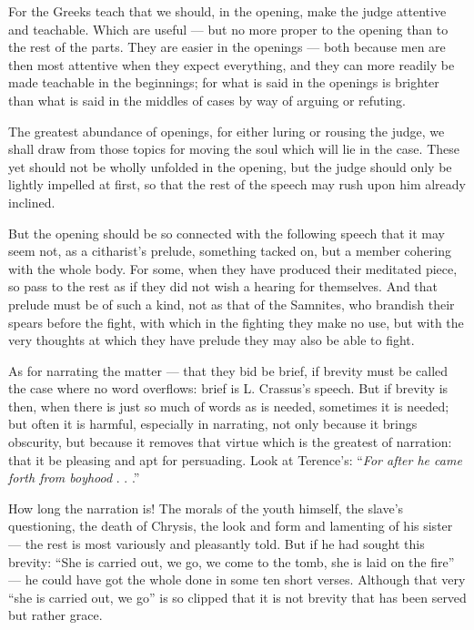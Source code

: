  For the Greeks teach that we should, in the opening, make the judge attentive and teachable. Which are useful — but no more proper to the opening than to the rest of the parts. They are easier in the openings — both because men are then most attentive when they expect everything, and they can more readily be made teachable in the beginnings; for what is said in the openings is brighter than what is said in the middles of cases by way of arguing or refuting.

 The greatest abundance of openings, for either luring or rousing the judge, we shall draw from those topics for moving the soul which will lie in the case. These yet should not be wholly unfolded in the opening, but the judge should only be lightly impelled at first, so that the rest of the speech may rush upon him already inclined.

 But the opening should be so connected with the following speech that it may seem not, as a citharist's prelude, something tacked on, but a member cohering with the whole body. For some, when they have produced their meditated piece, so pass to the rest as if they did not wish a hearing for themselves. And that prelude must be of such a kind, not as that of the Samnites, who brandish their spears before the fight, with which in the fighting they make no use, but with the very thoughts at which they have prelude they may also be able to fight.

 As for narrating the matter — that they bid be brief, if brevity must be called the case where no word overflows: brief is L. Crassus's speech. But if brevity is then, when there is just so much of words as is needed, sometimes it is needed; but often it is harmful, especially in narrating, not only because it brings obscurity, but because it removes that virtue which is the greatest of narration: that it be pleasing and apt for persuading. Look at Terence's: ``\textit{For after he came forth from boyhood} . . .''

 How long the narration is! The morals of the youth himself, the slave's questioning, the death of Chrysis, the look and form and lamenting of his sister — the rest is most variously and pleasantly told. But if he had sought this brevity: ``She is carried out, we go, we come to the tomb, she is laid on the fire'' — he could have got the whole done in some ten short verses. Although that very ``she is carried out, we go'' is so clipped that it is not brevity that has been served but rather grace.

